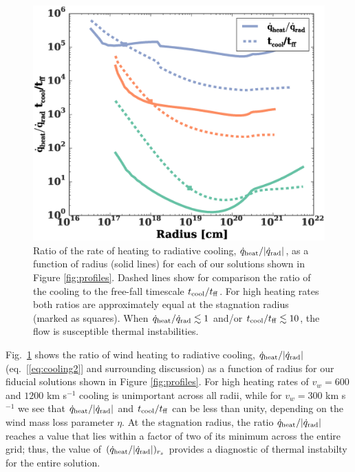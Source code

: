 \documentclass[usenatbib,fleqn]{mn2e}
\newcommand{\tcool}{t_{\rm cool}}
\newcommand{\tff}{t_{\rm ff}}
\begin{document}
\begin{figure}
  \includegraphics[width=\columnwidth]{cooling.eps}
  \caption{\label{fig:cooling} Ratio of the rate of heating to
radiative cooling, $\dot{q}_{\rm heat}/|\dot{q}_{\rm rad}|$, as a
function of radius (solid lines) for each of our solutions shown in
Figure \ref{fig:profiles}.  Dashed lines show for comparison the ratio
of the cooling to the free-fall timescale $t_{\rm cool}/t_{\rm ff}$.
For high heating rates both ratios are approximately equal at the
stagnation radius (marked as squares).  When $\dot{q}_{\rm
heat}/\dot{q}_{\rm rad} \lesssim 1$ and/or $t_{\rm cool}/t_{\rm ff}
\lesssim 10$, the flow is susceptible thermal instabilities.}
\end{figure}


Fig.~\ref{fig:cooling} shows the ratio of wind heating to radiative cooling, $\dot{q}_{\rm heat}/|\dot{q}_{\rm rad}|$ (eq.~[\ref{eq:cooling2}] and surrounding discussion) as a function of radius for our fiducial solutions shown in Figure \ref{fig:profiles}.  For high heating rates of $v_{w} = 600$ and $1200$ km s$^{-1}$ cooling is unimportant across all radii, while for $v_{w} = 300$ km s$^{-1}$ we see that $\dot{q}_{\rm heat}/|\dot{q}_{\rm rad}|$ and $\tcool/\tff$ can be less than unity, depending on the wind mass loss parameter $\eta$.  At the stagnation radius, the ratio $\dot{q}_{\rm heat}/|\dot{q}_{\rm rad}|$ reaches a value that lies within a factor of two of its minimum across the entire grid;  thus, the value of $(\dot{q}_{\rm heat}/|\dot{q}_{\rm rad}|)_{r_{s}}$ provides a diagnostic of thermal instabilty for the entire solution.  
\end{document}

